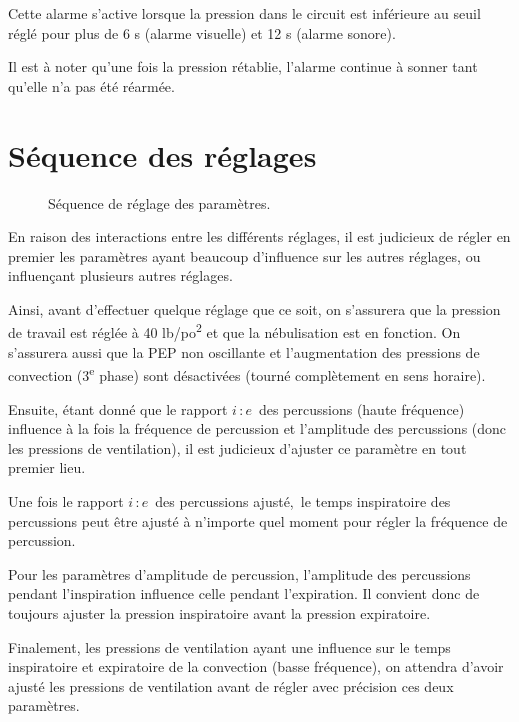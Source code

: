 \documentclass[letterpaper, titlepage]{article}
\def\ie{$i\, \colon e$}
\begin{document}
Cette alarme s'active lorsque la pression dans le circuit est inférieure
au seuil réglé pour plus de 6 s (alarme visuelle) et 12 s (alarme
sonore).

Il est à noter qu'une fois la pression rétablie, l'alarme continue à
sonner tant qu'elle n'a pas été réarmée.

\section{Séquence des réglages}

\begin{figure*}
	
	\caption{Séquence de réglage des paramètres.}
\end{figure*}

En raison des interactions entre les différents réglages, il est
judicieux de régler en premier les paramètres ayant beaucoup d'influence
sur les autres réglages, ou influençant plusieurs autres réglages.

Ainsi, avant d'effectuer quelque réglage que ce soit, on s'assurera que
la pression de travail est réglée à 40 lb/po\textsuperscript{2} et que la nébulisation est
en fonction. On s'assurera aussi que la PEP non oscillante et
l'augmentation des pressions de convection (3\textsuperscript{e} phase) sont désactivées
(tourné complètement en sens horaire).

Ensuite, étant donné que le rapport \ie\ des percussions (haute
fréquence) influence à la fois la fréquence de percussion et l'amplitude
des percussions (donc les pressions de ventilation), il est judicieux
d'ajuster ce paramètre en tout premier lieu.

Une fois le rapport \ie\ des percussions ajusté,~le temps inspiratoire
des percussions peut être ajusté à n'importe quel moment pour régler la
fréquence de percussion.

Pour les paramètres d'amplitude de percussion, l'amplitude des
percussions pendant l'inspiration influence celle pendant l'expiration.
Il convient donc de toujours ajuster la pression inspiratoire avant la
pression expiratoire.

Finalement, les pressions de ventilation ayant une influence sur le
temps inspiratoire et expiratoire de la convection (basse fréquence),
on attendra d'avoir ajusté les pressions de ventilation avant de régler
avec précision ces deux paramètres.
\end{document}
